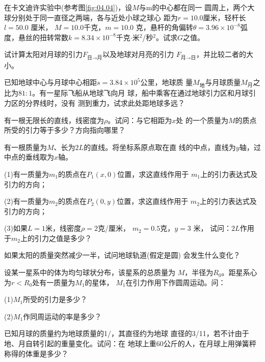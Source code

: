 \begin{exercises}

\exercise 在卡文迪许实验中(参考图\ref{fig:04.04})，设$ M $与$  $m的中心都在同一
圆周上，两个大球分别处于同一直径之两端，各与近处小球之球心
距为$  r = 1 0 . 0   $厘米，轻杆长$  l = 5 0 . 0  $ 厘米， $ M = 1 0 . 0  $千克，$  m = 1 0 . 0  $
克，悬杆的角偏转$  \theta = 3 . 9 6 \times 1 0 ^ { - 8 }  $弧度，悬丝的扭转常数$  k = 8 . 3 4
\times 1 0 ^ { - 8 }  $千克$ \cdot $米$ ^2 $/秒$ ^2 $。试求$ G $之值。

\exercise 试计算太阳对月球的引力$ F _ {\text{日}\to\text{月}} $以及地球对月亮的引力
$ F _ {\text{月}\to\text{日}} $，并比较二者的大小。

\exercise 已知地球中心与月球中心相距$  s = 3 . 8 4 \times 1 0 ^ 5 $公里，地球质
量$ M _ {\text{地}} $与月球质量$ M _ {\text{月}}$之比为$ 81:1 $。有一星际飞船从地球飞向月
球，船中乘客在通过地球引力区和月球引力区的分界线时，没有
测到重力，试求此处距地球多远？

\exercise 有一根无限长的直线，线密度为$ \rho $。试问：与它相距为$ x $处
的一个质量为$ M $的质点所受的引力等于多少？方向指向哪里？

\exercise 有一根质量为$ M $、长为$ 2L $的直线。将坐标系原点取在直
线的中点，直线为$ y $轴，过中点的垂线取为$ x $轴。

(1)有一质量为$  m _ { 1 }   $的质点在$  P _ { 1 } ( x, 0 )   $位置，求这直线作用于
$  m _ { 1 }   $上的引力表达式及引力的方向；

(2)有一质量为$  m _ { 2 }   $的质点在$  P _ { 2 } ( 0, y )   $位置，求这直线作用于
$  m _ { 2 }   $上的引力表达式及引力的方向；

(3)如果$  L = 1   $米，线密度$  \rho = 2  $克/厘米， $ m _ { 2 } = 0 . 5   $克，$ y = 3  $ 米，
试问：$ 2L $作用于$  m _ { 2 }   $上的引力之值是多少？

\exercise 如果太阳的质量突然减少一半，试问地球轨道(假定是圆)
会发生什么变化？

\exercise 设某一星系中的体为均匀球状分布，该星系的总质量为
$ M $，半径为$  R _ { 0 } $。距星系心为$  r < R _ { 0 }   $处有一质量为$ M _ 1 $的星体，
$ M _ 1 $在引力作用下作圆周运动。问：

(1)$  M _  1    $所受的引力是多少？

(2)$ M _ 1 $作同周运动的率是多少？

\exercise 已知月球的质量约为地球质量的1/，其直径约为地球
直径的3/11，若不计由于地、月自转引起的重量变化。试问：在
地球上重60公斤的人，在月球上用弹簧秤称得的体重是多少？


\end{exercises}
